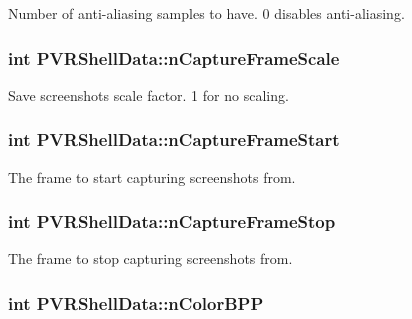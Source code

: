 Number of anti-\/aliasing samples to have. 0 disables anti-\/aliasing. \hypertarget{struct_p_v_r_shell_data_aeaf6bee7668691d9336c66d4220334df}{
\subsubsection[{n\+Capture\+Frame\+Scale}]{\setlength{\rightskip}{0pt plus 5cm}int P\+V\+R\+Shell\+Data\+::n\+Capture\+Frame\+Scale}}\label{struct_p_v_r_shell_data_aeaf6bee7668691d9336c66d4220334df}
Save screenshots scale factor. 1 for no scaling. \hypertarget{struct_p_v_r_shell_data_ae8f0afe7e59a66850cf7f3ba4a158088}{
\subsubsection[{n\+Capture\+Frame\+Start}]{\setlength{\rightskip}{0pt plus 5cm}int P\+V\+R\+Shell\+Data\+::n\+Capture\+Frame\+Start}}\label{struct_p_v_r_shell_data_ae8f0afe7e59a66850cf7f3ba4a158088}
The frame to start capturing screenshots from. \hypertarget{struct_p_v_r_shell_data_aeb706d61964c8bc8fd9b56936348a377}{
\subsubsection[{n\+Capture\+Frame\+Stop}]{\setlength{\rightskip}{0pt plus 5cm}int P\+V\+R\+Shell\+Data\+::n\+Capture\+Frame\+Stop}}\label{struct_p_v_r_shell_data_aeb706d61964c8bc8fd9b56936348a377}
The frame to stop capturing screenshots from. \hypertarget{struct_p_v_r_shell_data_a59a2d6c199f7bc5d4c6cd8498f773412}{
\subsubsection[{n\+Color\+B\+P\+P}]{\setlength{\rightskip}{0pt plus 5cm}int P\+V\+R\+Shell\+Data\+::n\+Color\+B\+P\+P}}\label{struct_p_v_r_shell_data_a59a2d6c199f7bc5d4c6cd8498f773412}

